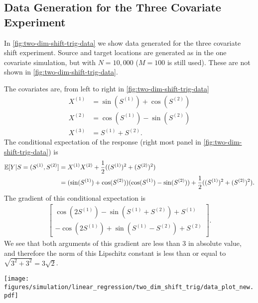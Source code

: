 \subsection{Data Generation for the Three Covariate Experiment}
In \cref{fig:two-dim-shift-trig-data} we show data generated for the three covariate shift experiment. Source and target locations are generated as in the one covariate simulation, but with $N=10{,}000$ ($M=100$ is still used). These are not shown in \cref{fig:two-dim-shift-trig-data}. 

The covariates are, from left to right in \cref{fig:two-dim-shift-trig-data}
\begin{align}
    X^{(1)} &= \sin(S^{(1)}) + \cos(S^{(2)}) \\
    X^{(2)} &= \cos(S^{(1)}) - \sin(S^{(2)}) \\
    X^{(3)} &= S^{(1)} + S^{(2)}.
\end{align}
The conditional expectation of the response (right most panel in \cref{fig:two-dim-shift-trig-data}) is 
\begin{align} 
    \mathbb{E}[Y|S=(S^{(1)},S^{(2)}] &= X^{(1)}X^{(2)} + \frac{1}{2}((S^{(1)})^2 + (S^{(2)})^2) \\
    &= (\sin(S^{(1)}) + \cos(S^{(2)}))(\cos(S^{(1)}) - \sin(S^{(2)})) + \frac{1}{2}((S^{(1)})^2 + (S^{(2)})^2).
\end{align}
The gradient of this conditional expectation is 
\begin{align}
    \begin{bmatrix}
    \cos(2S^{(1)})-\sin(S^{(1)} + S^{(2)}) + S^{(1)} \\
    - \cos(2S^{(1)}) + \sin(S^{(1)} - S^{(2)}) + S^{(2)}
    \end{bmatrix}.
\end{align}
We see that both arguments of this gradient are less than $3$ in absolute value, and therefore the norm of this Lipschitz constant is less than or equal to $\sqrt{3^2 + 3^2} = 3\sqrt{2}$.
\begin{figure*}
    \centering
    \texttt{[image: figures/simulation/linear\_regression/two\_dim\_shift\_trig/data\_plot\_new.pdf]}
    \caption{The first 3 plots from the left show the covariate surfaces, while the fourth shows the expected response at each spatial location for the second simulated experiment. The source and target locations (not shown) are the same as in \cref{fig:two-dim-shift-data}, though with $N=10{,}000$.}
    \label{fig:two-dim-shift-trig-data}
\end{figure*}